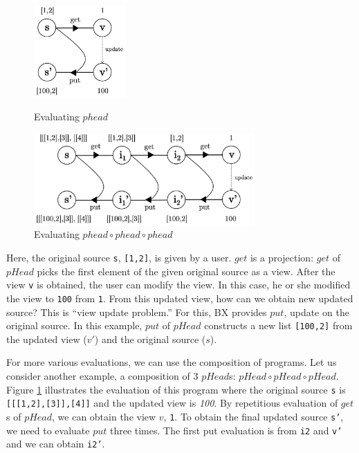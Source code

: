 \begin{figure}[!htb]
  \begin{minipage}{0.3\textwidth}
    \centering
    \includegraphics[height=3.5cm]{./fig/fig1.eps}
    \caption{Evaluating $phead$}
    \label{fig:eval-phead}
  \end{minipage}\hfill
  \begin{minipage}{0.7\textwidth}
    \centering
    \includegraphics[height=3.5cm]{./fig/fig2.eps}
    \caption{Evaluating $phead \circ phead \circ phead$}
    \label{fig:eval-comp-phead}
  \end{minipage}
\end{figure}

Here, the original source \texttt{s}, \texttt{[1,2]}, is given by a user. $get$ is a projection: $get$ of $pHead$ picks the first element of the given original source as a view.
After the view \texttt{v} is obtained, the user can modify the view.
In this case, he or she modified the view to \texttt{100} from \texttt{1}.
From this updated view, how can we obtain new updated source? This is ``view update problem.'' For this, BX provides $put$, update on the original source.
In this example, $put$ of $pHead$ constructs a new list \texttt{[100,2]} from the updated view ($v'$) and the original source ($s$).

For more various evaluations, we can use the composition of programs. Let us consider another example, a composition of 3 $pHead$s: $pHead \circ pHead \circ pHead$. Figure \ref{fig:eval-comp-phead} illustrates the evaluation of this program where the original source \texttt{s} is \texttt{[[[1,2],[3]],[4]]} and the updated view is \textit{100}.
By repetitious evaluation of $get$s of $pHead$, we can obtain the view $v$, \texttt{1}. To obtain the final updated source \texttt{s'}, we need to evaluate $put$ three times. The first put evaluation is from \texttt{i2} and \texttt{v'} and we can obtain \texttt{i2'}.

